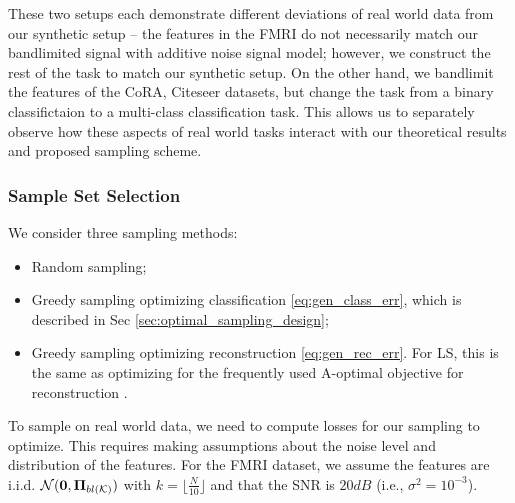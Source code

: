 These two setups each demonstrate different deviations of real world data from our synthetic setup -- the features in the FMRI do not necessarily match our bandlimited signal with additive noise signal model; however, we construct the rest of the task to match our synthetic setup. On the other hand, we bandlimit the features of the CoRA, Citeseer  datasets, but change the task from a binary classifictaion to a multi-class classification task. This allows us to separately observe how these aspects of real world tasks interact with our theoretical results and proposed sampling scheme.


\subsubsection{Sample Set Selection}
We consider three sampling methods:
\begin{itemize}
    \item Random sampling;
    \item Greedy sampling optimizing classification  \eqref{eq:gen_class_err}, which is described in Sec \ref{sec:optimal_sampling_design};
    \item Greedy sampling optimizing reconstruction  \eqref{eq:gen_rec_err}. For LS, this is the same as optimizing for the frequently used A-optimal objective for reconstruction \cite{wang2018optimal, wang2019low, sripathmanathan2024impact, mfn}.
\end{itemize}



To sample on real world data, we need to compute losses for our sampling to optimize. This requires making assumptions about the noise level and distribution of the features. For the FMRI dataset, we assume the features are i.i.d. $\mathcal{N}(\vect{0},\projbl)$ with $k = \lfloor \frac{N}{10}\rfloor$ and that the SNR is $20dB$ (i.e., $\sigma^{2}=10^{-3}$). 

